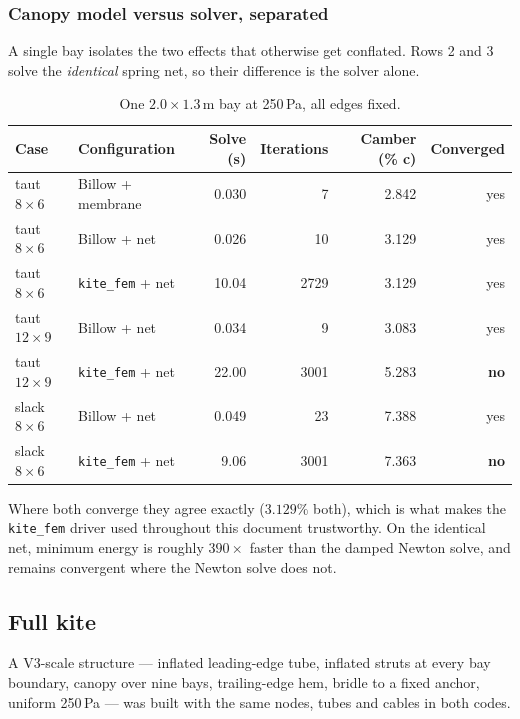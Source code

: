 \documentclass[11pt,a4paper]{article}
\newcommand{\code}[1]{\texttt{\small #1}}
\begin{document}
\subsubsection{Canopy model versus solver, separated}

A single bay isolates the two effects that otherwise get conflated. Rows 2 and 3
solve the \emph{identical} spring net, so their difference is the solver alone.

\begin{table}[H]
\centering
\small
\caption{One $2.0\times1.3$\,m bay at 250\,Pa, all edges fixed.}
\begin{tabular}{llrrrr}
\toprule
Case & Configuration & Solve (s) & Iterations & Camber (\% c) & Converged\\
\midrule
taut $8\times6$ & Billow + membrane   & 0.030 & 7 & 2.842 & yes\\
taut $8\times6$ & Billow + net        & 0.026 & 10 & 3.129 & yes\\
taut $8\times6$ & \code{kite\_fem} + net & 10.04 & 2729 & 3.129 & yes\\
\midrule
taut $12\times9$ & Billow + net        & 0.034 & 9 & 3.083 & yes\\
taut $12\times9$ & \code{kite\_fem} + net & 22.00 & 3001 & 5.283 & \textbf{no}\\
\midrule
slack $8\times6$ & Billow + net        & 0.049 & 23 & 7.388 & yes\\
slack $8\times6$ & \code{kite\_fem} + net & 9.06 & 3001 & 7.363 & \textbf{no}\\
\bottomrule
\end{tabular}
\end{table}

Where both converge they agree exactly ($3.129\%$ both), which is what makes the
\code{kite\_fem} driver used throughout this document trustworthy. On the
identical net, minimum energy is roughly $390\times$ faster than the damped
Newton solve, and remains convergent where the Newton solve does not.

\subsection{Full kite}

A V3-scale structure --- inflated leading-edge tube, inflated struts at every bay
boundary, canopy over nine bays, trailing-edge hem, bridle to a fixed anchor,
uniform 250\,Pa --- was built with the same nodes, tubes and cables in both codes.
\end{document}
